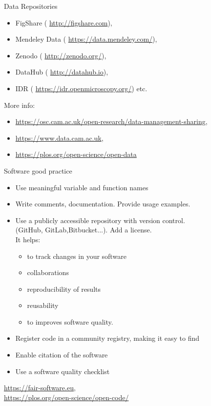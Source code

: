 \documentclass[ignorenonframetext,aspectratio=169,10pt,xcolor=table]{beamer}
\begin{document}
\begin{frame}{Data Repositories}
\begin{itemize}
\item FigShare ( \url{http://figshare.com}),
\item Mendeley Data ( \url{https://data.mendeley.com/}),
\item Zenodo ( \url{http://zenodo.org/}),
\item DataHub ( \url{http://datahub.io}),
\item IDR ( \url{https://idr.openmicroscopy.org/}) etc.
\end{itemize}

\vspace{1cm}
More info:
{\tiny
\begin{itemize}
\item \url{https://osc.cam.ac.uk/open-research/data-management-sharing},
\item  \url{https://www.data.cam.ac.uk},
\item \url{https://plos.org/open-science/open-data}
\end{itemize}
}
\end{frame}

\begin{frame}{Software good practice}

\begin{itemize}
	\item Use meaningful variable and function names
	\item Write comments, documentation. Provide usage examples.
	\item Use a publicly accessible repository with version control. \\
	 (GitHub, GitLab,Bitbucket...). Add a license.\\
	It helps:
	\begin{itemize}
	\item to track changes in your software
	\item collaborations
	\item reproducibility of results
	\item reusability
	\item to improves software quality.
	\end{itemize}


	\item Register code in a community registry, making it easy to find
	\item Enable citation of the software
	\item Use a software quality checklist
\end{itemize}

\vspace{1cm}
\begin{flushright}
{\tiny \url{https://fair-software.eu},\\
\url{https://plos.org/open-science/open-code/}}
\end{flushright}
\end{frame}
\end{document}
